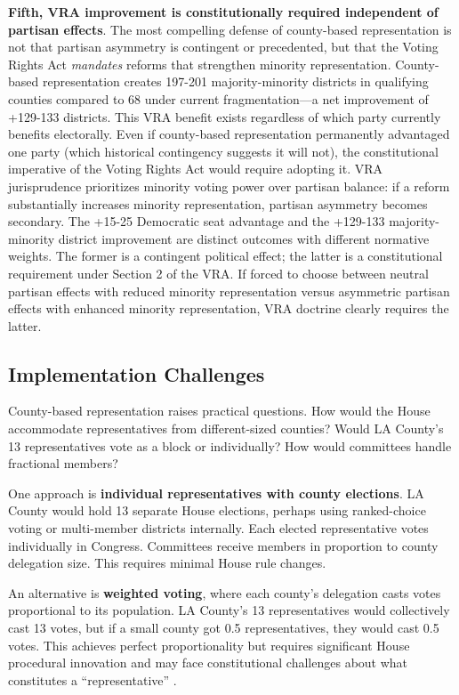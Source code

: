 \textbf{Fifth, VRA improvement is constitutionally required independent of partisan effects}. The most compelling defense of county-based representation is not that partisan asymmetry is contingent or precedented, but that the Voting Rights Act \emph{mandates} reforms that strengthen minority representation. County-based representation creates 197-201 majority-minority districts in qualifying counties compared to 68 under current fragmentation---a net improvement of +129-133 districts. This VRA benefit exists regardless of which party currently benefits electorally. Even if county-based representation permanently advantaged one party (which historical contingency suggests it will not), the constitutional imperative of the Voting Rights Act would require adopting it. VRA jurisprudence prioritizes minority voting power over partisan balance: if a reform substantially increases minority representation, partisan asymmetry becomes secondary. The +15-25 Democratic seat advantage and the +129-133 majority-minority district improvement are distinct outcomes with different normative weights. The former is a contingent political effect; the latter is a constitutional requirement under Section 2 of the VRA. If forced to choose between neutral partisan effects with reduced minority representation versus asymmetric partisan effects with enhanced minority representation, VRA doctrine clearly requires the latter.

\subsection{Implementation Challenges}

County-based representation raises practical questions. How would the House accommodate representatives from different-sized counties? Would LA County's 13 representatives vote as a block or individually? How would committees handle fractional members?

One approach is \textbf{individual representatives with county elections}. LA County would hold 13 separate House elections, perhaps using ranked-choice voting or multi-member districts internally. Each elected representative votes individually in Congress. Committees receive members in proportion to county delegation size. This requires minimal House rule changes.

An alternative is \textbf{weighted voting}, where each county's delegation casts votes proportional to its population. LA County's 13 representatives would collectively cast 13 votes, but if a small county got 0.5 representatives, they would cast 0.5 votes. This achieves perfect proportionality but requires significant House procedural innovation and may face constitutional challenges about what constitutes a ``representative'' \citep{banzhaf1968power}.

